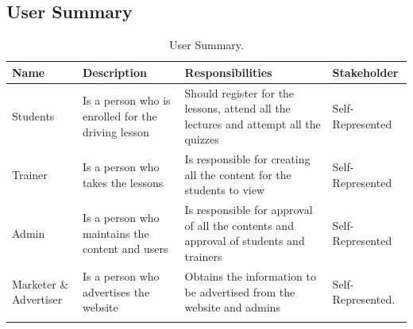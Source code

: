 \documentclass{report}
\begin{document}
\subsection{User Summary}

\begin{longtable}{|p{3.5cm}|p{3.5cm}|p{4.5cm}|p{4cm}|}
\hline
\textbf{Name} & \textbf{Description} & \textbf{Responsibilities} & \textbf{Stakeholder}\\ \hline
Students & Is a person who is enrolled for the driving lesson & Should register for the lessons, attend all the lectures and attempt all the quizzes & Self-Represented \\ \hline
Trainer & Is a person who takes the lessons & Is responsible for creating all the content for the students to view & Self-Represented \\ \hline
Admin & Is a person who maintains the content and users  & Is responsible for approval of all the contents and approval of students and trainers & Self-Represented \\ \hline
Marketer \& Advertiser & Is a person who advertises the website & Obtains the information to be advertised from the website and admins & Self-Represented.\\ \hline
\caption{User Summary.\label{long}}
\end{longtable}

\clearpage
\end{document}
